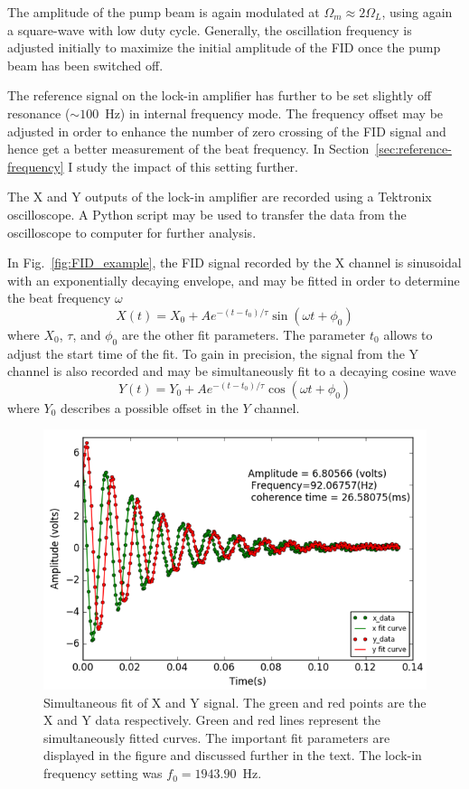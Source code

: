 The amplitude of the pump beam is again modulated at $\Omega_m\approx
2\Omega_L$, using again a square-wave with low duty cycle.  Generally,
the oscillation frequency is adjusted initially to maximize the
initial amplitude of the FID once the pump beam has been switched off.

The reference signal on the lock-in amplifier has further to be set
slightly off resonance ($\sim 100$~Hz) in internal frequency mode.
The frequency offset may be adjusted in order to enhance the number of
zero crossing of the FID signal and hence get a better measurement of
the beat frequency.  In Section~\ref{sec:reference-frequency} I study the
impact of this setting further.

The X and Y outputs of the lock-in amplifier are recorded using a
Tektronix oscilloscope.  A Python script may be used to transfer the
data from the oscilloscope to computer for further analysis.

In Fig.~\ref{fig:FID_example}, the FID signal recorded by the X
channel is sinusoidal with an exponentially decaying envelope, and may
be fitted in order to determine the beat frequency $\omega$
\begin{equation}
X(t)=X_0+Ae^{-(t-t_0)/\tau}\sin(\omega
t+\phi_0)\label{eq:decaying_sinwave}
\end{equation}  
where $X_0$, $\tau$, and $\phi_0$ are the other fit parameters.  The
parameter $t_0$ allows to adjust the start time of the fit.  To gain
in precision, the signal from the Y channel is also recorded and may
be simultaneously fit to a decaying cosine wave
\begin{equation}
Y(t)=Y_0+Ae^{-(t-t_0)/\tau}\cos(\omega
t+\phi_0)\label{eq:decaying_coswave}
\end{equation}
where $Y_0$ describes a possible offset in the $Y$ channel.

\begin{figure}%
\centering\includegraphics[width=0.55\linewidth]{figures/fid_simultaneous}
\caption{Simultaneous fit of X and Y signal.  The green and red points
  are the X and Y data respectively.  Green and red lines represent
  the simultaneously fitted curves.  The important fit parameters are
  displayed in the figure and discussed further in the text.  The
  lock-in frequency setting was $f_0=1943.90$~Hz.\label{fig:FID_fit}}
\end{figure}

